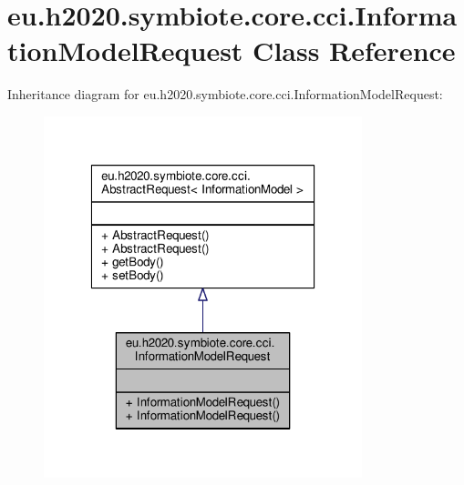 \hypertarget{classeu_1_1h2020_1_1symbiote_1_1core_1_1cci_1_1InformationModelRequest}{}\section{eu.\+h2020.\+symbiote.\+core.\+cci.\+Information\+Model\+Request Class Reference}
\label{classeu_1_1h2020_1_1symbiote_1_1core_1_1cci_1_1InformationModelRequest}


Inheritance diagram for eu.\+h2020.\+symbiote.\+core.\+cci.\+Information\+Model\+Request\+:
\nopagebreak
\begin{figure}[H]
\begin{center}
\leavevmode
\includegraphics[width=262pt]{classeu_1_1h2020_1_1symbiote_1_1core_1_1cci_1_1InformationModelRequest__inherit__graph}
\end{center}
\end{figure}


